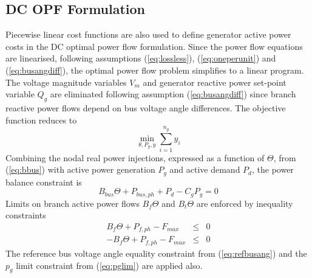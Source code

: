 \subsection{DC OPF Formulation}
Piecewise linear cost functions are also used to define generator active power
costs in the DC optimal power flow formulation.  Since the power flow equations
are linearised, following assumptions (\ref{eq:lossless}), (\ref{eq:oneperunit})
and (\ref{eq:busangdiff}), the optimal power flow problem simplifies to a
linear program.  The voltage magnitude variables $V_m$ and generator reactive
power set-point variable $Q_g$ are eliminated following assumption
(\ref{eq:busangdiff}) since branch reactive power flows depend on bus voltage
angle differences.  The objective function reduces to
\begin{equation}
\min_{\theta, P_g, y} \sum_{i=1}^{n_g}y_i
\end{equation}
Combining the nodal real power injections, expressed as a function of $\Theta$,
from (\ref{eq:bbus}) with active power generation $P_g$ and active demand $P_d$,
the power balance constraint is
\begin{equation}
B_{bus}\Theta + P_{bus,ph} + P_d - C_gP_g = 0
\end{equation}
Limits on branch active power flows $B_f\Theta$ and $B_t\Theta$ are enforced by
inequality constraints
\begin{eqnarray}
B_f\Theta + P_{f,ph} - F_{max}& \leq& 0\\
-B_f\Theta + P_{f,ph} - F_{max}& \leq& 0
\end{eqnarray}
The reference bus voltage angle equality constraint from (\ref{eq:refbusang})
and the $p_g$ limit constraint from (\ref{eq:pglim}) are applied also.



